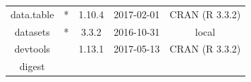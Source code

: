 \documentclass[]{article}
\begin{document}
\begin{itemize}
\begin{longtable}[]{@{}ccccc@{}}
\begin{minipage}[t]{0.13\columnwidth}
  data.table\strut
  \end{minipage} & \begin{minipage}[t]{0.05\columnwidth}\centering\strut
  *\strut
  \end{minipage} & \begin{minipage}[t]{0.13\columnwidth}\centering\strut
  1.10.4\strut
  \end{minipage} & \begin{minipage}[t]{0.13\columnwidth}\centering\strut
  2017-02-01\strut
  \end{minipage} & \begin{minipage}[t]{0.29\columnwidth}\centering\strut
  CRAN (R 3.3.2)\strut
  \end{minipage}\tabularnewline
  \begin{minipage}[t]{0.13\columnwidth}\centering\strut
  datasets\strut
  \end{minipage} & \begin{minipage}[t]{0.05\columnwidth}\centering\strut
  *\strut
  \end{minipage} & \begin{minipage}[t]{0.13\columnwidth}\centering\strut
  3.3.2\strut
  \end{minipage} & \begin{minipage}[t]{0.13\columnwidth}\centering\strut
  2016-10-31\strut
  \end{minipage} & \begin{minipage}[t]{0.29\columnwidth}\centering\strut
  local\strut
  \end{minipage}\tabularnewline
  \begin{minipage}[t]{0.13\columnwidth}\centering\strut
  devtools\strut
  \end{minipage} & \begin{minipage}[t]{0.05\columnwidth}\centering\strut
  \strut
  \end{minipage} & \begin{minipage}[t]{0.13\columnwidth}\centering\strut
  1.13.1\strut
  \end{minipage} & \begin{minipage}[t]{0.13\columnwidth}\centering\strut
  2017-05-13\strut
  \end{minipage} & \begin{minipage}[t]{0.29\columnwidth}\centering\strut
  CRAN (R 3.3.2)\strut
  \end{minipage}\tabularnewline
  \begin{minipage}[t]{0.13\columnwidth}\centering\strut
  digest\strut
  \end{minipage} & \begin{minipage}[t]{0.05\columnwidth}\centering\strut

\end{minipage}
\end{longtable}
\end{itemize}
\end{document}
